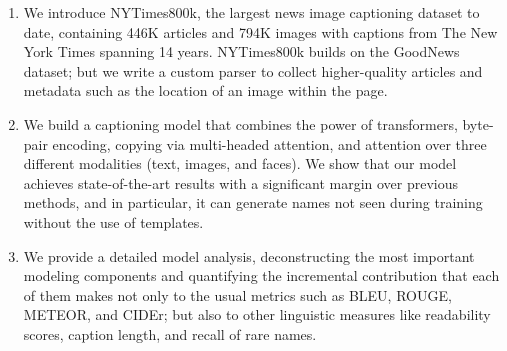 \begin{enumerate}
   \item We introduce NYTimes800k, the largest news image captioning dataset to
   date, containing 446K articles and 794K images with captions from The New
   York Times spanning 14 years. NYTimes800k builds on the GoodNews dataset;
   but we write a custom parser to collect higher-quality articles and metadata
   such as the location of an image within the page.

   \item We build a captioning model that combines the power of transformers,
   byte-pair encoding, copying via multi-headed attention, and attention over
   three different modalities (text, images, and faces). We show that our model
   achieves state-of-the-art results with a significant margin over previous
   methods, and in particular, it can generate names not seen during training
   without the use of templates.

   \item We provide a detailed model analysis, deconstructing the most
   important modeling components and quantifying the incremental contribution
   that each of them makes not only to the usual metrics such as BLEU, ROUGE,
   METEOR, and CIDEr; but also to other linguistic measures like readability
   scores, caption length, and recall of rare names.
\end{enumerate}
